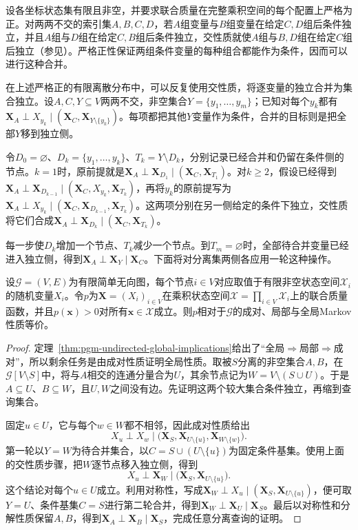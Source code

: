 设各坐标状态集有限且非空，并要求联合质量在完整乘积空间的每个配置上严格为正。对两两不交的索引集$A,B,C,D$，若$A$组变量与$B$组变量在给定$C,D$组后条件独立，并且$A$组与$D$组在给定$C,B$组后条件独立，交性质就使$A$组与$B,D$组在给定$C$组后独立（参见）。严格正性保证两组条件变量的每种组合都能作为条件，因而可以进行这种合并。

在上述严格正的有限离散分布中，可以反复使用交性质，将逐变量的独立合并为集合独立。设$A,C,Y\subseteq V$两两不交，非空集合$Y=\{y_1,\ldots,y_m\}$；已知对每个$y_k$都有$\bm{X}_A\perp X_{y_k}\mid(\bm{X}_C,\bm{X}_{Y\setminus\{y_k\}})$。每项都把其他$Y$变量作为条件，合并的目标则是把全部$Y$移到独立侧。

令$D_0=\varnothing$、$D_k=\{y_1,\ldots,y_k\}$、$T_k=Y\setminus D_k$，分别记录已经合并和仍留在条件侧的节点。$k=1$时，原前提就是$\bm{X}_A\perp\bm{X}_{D_1}\mid(\bm{X}_C,\bm{X}_{T_1})$。对$k\geq2$，假设已经得到$\bm{X}_A\perp\bm{X}_{D_{k-1}}\mid(\bm{X}_C,X_{y_k},\bm{X}_{T_k})$，再将$y_k$的原前提写为$\bm{X}_A\perp X_{y_k}\mid(\bm{X}_C,\bm{X}_{D_{k-1}},\bm{X}_{T_k})$。这两项分别在另一侧给定的条件下独立，交性质将它们合成$\bm{X}_A\perp\bm{X}_{D_k}\mid(\bm{X}_C,\bm{X}_{T_k})$。

每一步使$D_k$增加一个节点、$T_k$减少一个节点。到$T_m=\varnothing$时，全部待合并变量已经进入独立侧，得到$\bm{X}_A\perp\bm{X}_Y\mid\bm{X}_C$。下面将对分离集两侧各应用一轮这种操作。

\begin{theorem}[严格正条件下三种Markov性质等价]
  \label{thm:pgm-undirected-markov-equivalence}
  设$\mathcal{G}=(V,E)$为有限简单无向图，每个节点$i\in V$对应取值于有限非空状态空间$\mathcal{X}_i$的随机变量$X_i$。令$p$为$\bm{X}=(X_i)_{i\in V}$在乘积状态空间$\mathcal{X}=\prod_{i\in V}\mathcal{X}_i$上的联合质量函数，并且$p(\bm{x})>0$对所有$\bm{x}\in\mathcal{X}$成立。则$p$相对于$\mathcal{G}$的成对、局部与全局Markov性质等价。
\end{theorem}

\begin{proof}
定理~\ref{thm:pgm-undirected-global-implications}给出了“全局$\Rightarrow$局部$\Rightarrow$成对”，所以剩余任务是由成对性质证明全局性质。取被$S$分离的非空集合$A,B$，在$\mathcal{G}[V\setminus S]$中，将与$A$相交的连通分量合为$U$，其余节点记为$W=V\setminus(S\cup U)$。于是$A\subseteq U$、$B\subseteq W$，且$U,W$之间没有边。先证明这两个较大集合条件独立，再缩到查询集合。

固定$u\in U$，它与每个$w\in W$都不相邻，因此成对性质给出
\[
  X_u\perp X_w
  \mid
  \bigl(\bm{X}_S,\bm{X}_{U\setminus\{u\}},
        \bm{X}_{W\setminus\{w\}}\bigr).
\]
第一轮以$Y=W$为待合并集合，以$C=S\cup(U\setminus\{u\})$为固定条件基集。使用上面的交性质步骤，把$W$逐节点移入独立侧，得到
\[
  X_u\perp\bm{X}_W
  \mid\bigl(\bm{X}_S,\bm{X}_{U\setminus\{u\}}\bigr).
\]
这个结论对每个$u\in U$成立。利用对称性，写成$\bm{X}_W\perp X_u\mid(\bm{X}_S,\bm{X}_{U\setminus\{u\}})$，便可取$Y=U$、条件基集$C=S$进行第二轮合并，得到$\bm{X}_W\perp\bm{X}_U\mid\bm{X}_S$。最后以对称性和分解性质保留$A,B$，得到$\bm{X}_A\perp\bm{X}_B\mid\bm{X}_S$，完成任意分离查询的证明。
\end{proof}

